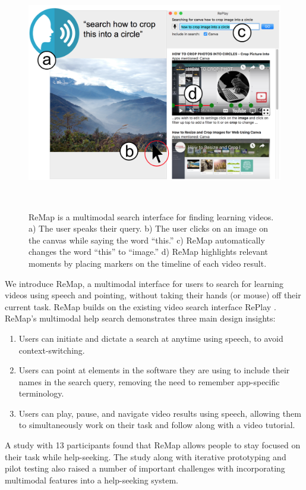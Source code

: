 \begin{figure}
\centering
  \includegraphics[width=\textwidth]{remap/figures/interface.png}
  \caption{ReMap is a multimodal search interface for finding learning videos. a) The user speaks their query. b) The user clicks on an image on the canvas while saying the word ``this.'' c) ReMap automatically changes the word ``this'' to ``image.'' d) ReMap highlights relevant moments by placing markers on the timeline of each video result.}~\label{fig:remap_interface}
  \vspace{-0.3in}
\end{figure}

We introduce ReMap, a multimodal interface for users to search for learning videos using speech and pointing, without taking their hands (or mouse) off their current task. ReMap builds on the existing video search interface RePlay \cite{Fraser2019}. ReMap's multimodal help search demonstrates three main design insights:
\begin{enumerate}
\item Users can initiate and dictate a search at anytime using speech, to avoid context-switching.
\item Users can point at elements in the software they are using to include their names in the search query, removing the need to remember app-specific terminology.
\item Users can play, pause, and navigate video results using speech, allowing them to simultaneously work on their task and follow along with a video tutorial.
\end{enumerate}

A study with 13 participants found that ReMap allows people to stay focused on their task while help-seeking. The study along with iterative prototyping and pilot testing also raised a number of important challenges with incorporating multimodal features into a help-seeking system.